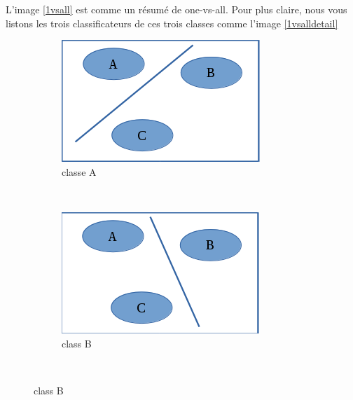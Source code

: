 L'image \ref{1vsall} est comme un résumé de one-vs-all. Pour plus claire, nous vous listons les trois classificateurs de ces trois classes comme l'image \ref{1vsalldetail}

\begin{figure}
        \centering
        \begin{subfigure}[b]{0.3\textwidth}
                \includegraphics[width=\textwidth]{images/classa}
                \caption{classe A}
                \label{classa}
        \end{subfigure}%
        ~ %
        \begin{subfigure}[b]{0.3\textwidth}
                \includegraphics[width=\textwidth]{images/classb}
                \caption{class B}
                \label{classb}
        \end{subfigure}
        ~ %

\end{figure}

